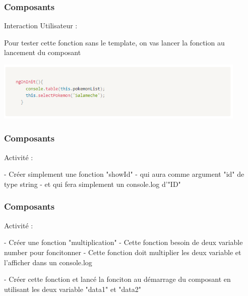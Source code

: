 \documentclass[10pt]{beamer}
\begin{document}
	\begin{frame}
		\frametitle{Composants}

		Interaction Utilisateur : \newline \newline

		Pour tester cette fonction sans le template, on vas lancer la fonction au lancement du composant

		\centering
		\includegraphics[width=12cm]{assets/userInt2} \newline


	\end{frame}

	\begin{frame}
		\frametitle{Composants}

		Activité : \newline \newline

		- Créer simplement une fonction "showId" \newline
		- qui aura comme argument "id" de type string \newline
		- et qui fera simplement un console.log d'"ID"

	\end{frame}

	\begin{frame}
		\frametitle{Composants}

		Activité : \newline \newline

		- Créer une fonction "multiplication" \newline
		- Cette fonction besoin de deux variable number pour foncitonner \newline
		- Cette fonction doit multiplier les deux variable et l'afficher dans un console.log \newline

		- Créer cette fonction et lancé la fonciton au démarrage du composant \newline en utilisant les deux variable "data1" et "data2"


	\end{frame}
\end{document}
